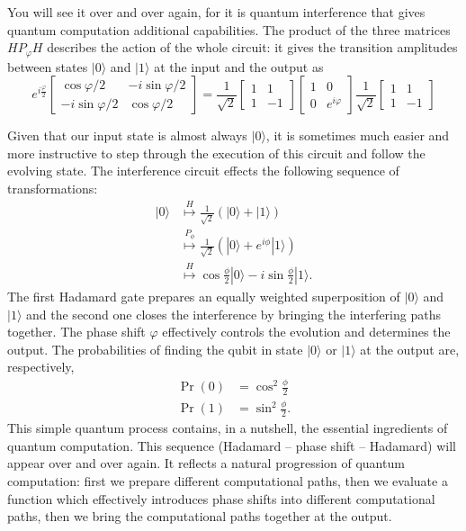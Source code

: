 \documentclass[fleqn]{article}
\renewcommand{\footnote}[1]{\en{#1}}
\begin{document}
You will see it over and over again, for it is quantum interference that gives quantum computation additional capabilities.
The product of the three matrices \(HP_\varphi H\) describes the action of the whole circuit: it gives the transition amplitudes between states \(|0\rangle\) and \(|1\rangle\) at the input and the output as
\[
  e^{i\frac{\varphi}{2}}
  \begin{bmatrix}
    \cos\varphi/2 & -i\sin\varphi/2
  \\-i\sin\varphi/2 & \cos\varphi/2
  \end{bmatrix}
  =
  \frac{1}{\sqrt 2}
  \begin{bmatrix}
    1 & 1
  \\1 & -1
  \end{bmatrix}
  \begin{bmatrix}
    1 & 0
  \\0 & e^{i\varphi}
  \end{bmatrix}
  \frac{1}{\sqrt 2}
  \begin{bmatrix}
    1 & 1
  \\1 & -1
  \end{bmatrix}
\]

Given that our input state is almost always \(|0\rangle\), it is sometimes much easier and more instructive to step through the execution of this circuit and follow the evolving state.
The interference circuit effects the following sequence of transformations:\footnote{We ignore the global phase factor \(e^{i\frac{\varphi}{2}}\).}
\[
  \begin{aligned}
    |0\rangle
    &\overset{H}{\longmapsto}
    \frac{1}{\sqrt2} \left(
      |0\rangle+|1\rangle
    \right)
  \\&\overset{P_\phi}{\longmapsto}
    \frac{1}{\sqrt2} \left(
      |0\rangle+e^{i\phi}|1\rangle
    \right)
  \\&\overset{H}{\longmapsto}
    \cos\frac{\phi}{2}|0\rangle - i\sin\frac{\phi}{2}|1\rangle.
  \end{aligned}
\]
The first Hadamard gate prepares an equally weighted superposition of \(|0\rangle\) and \(|1\rangle\) and the second one closes the interference by bringing the interfering paths together.
The phase shift \(\varphi\) effectively controls the evolution and determines the output.
The probabilities of finding the qubit in state \(|0\rangle\) or \(|1\rangle\) at the output are, respectively,
\[
  \begin{aligned}
    \Pr(0) &= \cos^2\frac{\phi}{2}
  \\\Pr(1) &= \sin^2\frac{\phi}{2}.
  \end{aligned}
\]
This simple quantum process contains, in a nutshell, the essential ingredients of quantum computation.
This sequence (Hadamard -- phase shift -- Hadamard) will appear over and over again.
It reflects a natural progression of quantum computation: first we prepare different computational paths, then we evaluate a function which effectively introduces phase shifts into different computational paths, then we bring the computational paths together at the output.
\end{document}
